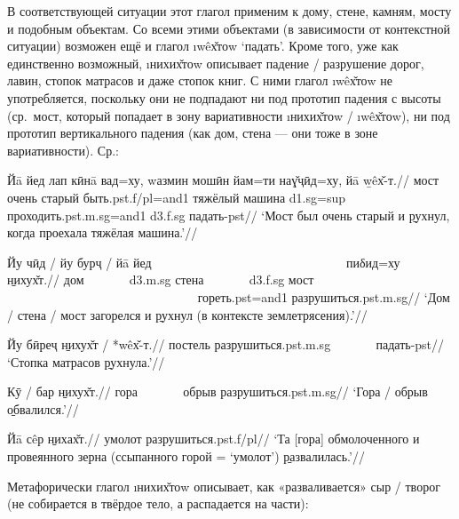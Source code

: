 В соответствующей ситуации этот глагол применим к дому, стене, камням, мосту и подобным объектам. Со всеми этими объектами (в зависимости от контекстной ситуации) возможен ещё и глагол \i{wêх̌тоw} ‘падать’. Кроме того, уже как единственно возможный, \i{нихих̌тоw} описывает падение / разрушение дорог, лавин, стопок матрасов и даже стопок книг. С ними глагол \i{wêх̌тоw} не употребляется, поскольку они не подпадают ни под прототип падения с высоты (ср.~мост, который попадает в зону вариативности \i{нихих̌тоw} / \i{wêх̌тоw}), ни под прототип вертикального падения (как дом, стена — они тоже в зоне вариативности). Ср.:

\begingl
\gla Йā йед лап кӣнā вад=ху, wазмин мошӣн йам=ти наɣ̌ҷӣд=ху, йā \b{wêх̌-т}.//
 мост очень старый быть.{\sc pst.f/pl=and1} тяжёлый машина {\sc d1.sg=sup} проходить.{\sc pst.m.sg=and1} {\sc d3.f.sg} падать-{\sc pst}//
\glft ‘Мост был очень старый и \b{рухнул}, когда проехала тяжёлая машина.’//
\endgl \xe

\begingl
\gla Йу чӣд / йу бурҷ / йā йед ~~~~~~~~~~~~~~~~~~~~~~~~~~~~~~ пиδид=ху \b{нихух̌т}.//
 дом ~~~~~~ {\sc d3.m.sg} стена ~~~~~~ {\sc d3.f.sg} мост ~~~~~~~~~~~~~~~~~~~~~~~~~~~~~~ гореть.{\sc pst=and1} разрушиться.{\sc pst.m.sg}//
\glft ‘Дом / стена / мост загорелся и \b{рухнул} (в контексте землетрясения).’//
\endgl \xe

\begingl
\gla Йу бӣреҷ \b{нихух̌т} / *wêх̌-т.//
 постель разрушиться.{\sc pst.m.sg} ~~~~~~ падать-{\sc pst}//
\glft ‘Стопка матрасов \b{рухнула}.’//
\endgl \xe

\begingl
\gla Кӯ / бар \b{нихух̌т}.//
\glc гора ~~~~~~ обрыв разрушиться.{\sc pst.m.sg}//
\glft ‘Гора / обрыв \b{обвалился}.’//
\endgl \xe

\begingl
\gla Йā сêр \b{нихах̌т}.//
 умолот разрушиться.{\sc pst.f/pl}//
\glft ‘Та [гора] обмолоченного и провеянного зерна (ссыпанного горой = ‘умолот’) \b{развалилась}.’//
\endgl \xe

Метафорически глагол \i{нихих̌тоw} описывает, как «разваливается» сыр / творог (не собирается в твёрдое тело, а распадается на части):

